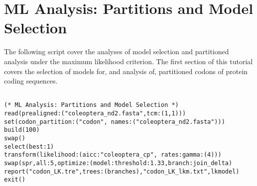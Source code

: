 

\section{ML Analysis: Partitions and Model Selection}{\label{tutorial16}}

The following script cover the analyses of model selection and partitioned analysis under 
the maximum likelihood criterion. The first section of this tutorial covers the selection 
of models for, and analysis of, partitioned codons of protein coding sequences. 

\begin{verbatim}

(* ML Analysis: Partitions and Model Selection *) 
read(prealigned:("coleoptera_nd2.fasta",tcm:(1,1)))
set(codon_partition:("codon", names:("coleoptera_nd2.fasta")))
build(100)
swap()
select(best:1)
transform(likelihood:(aicc:"coleoptera_cp", rates:gamma:(4)))
swap(spr,all:5,optimize:(model:threshold:1.33,branch:join_delta)
report("codon_LK.tre",trees:(branches),"codon_LK_lkm.txt",lkmodel)
exit()
\end{verbatim}


